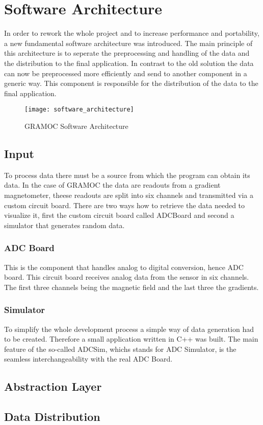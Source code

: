 \chapter{Software Architecture}
\label{ch:Software_Architecture}

In order to rework the whole project and to increase performance and portability, a new fundamental software architecture was introduced. The main principle of this architecture is to seperate the preprocessing and handling of the data and the distribution to the final application. In contrast to the old solution the data can now be preprocessed more efficiently and send to another component in a generic way. This component is responsible for the distribution of the data to the final application.

\begin{figure}[H]
    \centering
    \texttt{[image: software\_architecture]}
    \caption{GRAMOC Software Architecture}
    \label{fig:software_architecture}
\end{figure}

\section{Input}

To process data there must be a source from which the program can obtain its data. In the case of GRAMOC the data are readouts from a gradient magnetometer, theese readouts are split into six channels and transmitted via a custom circuit board. There are two ways how to retrieve the data needed to visualize it, first the custom circuit board called ADCBoard and second a simulator that generates random data.

\subsection{ADC Board}

This is the component that handles analog to digital conversion, hence ADC board. This circuit board receives analog data from the sensor in six channels. The first three channels being the magnetic field and the last three the gradients.

\subsection{Simulator}

To simplify the whole development process a simple way of data generation had to be created. Therefore a small application written in C++ was built. The main feature of the so-called ADCSim, whichs stands for ADC Simulator, is the seamless interchangeability with the real ADC Board. 

\section{Abstraction Layer}


\section{Data Distribution}
